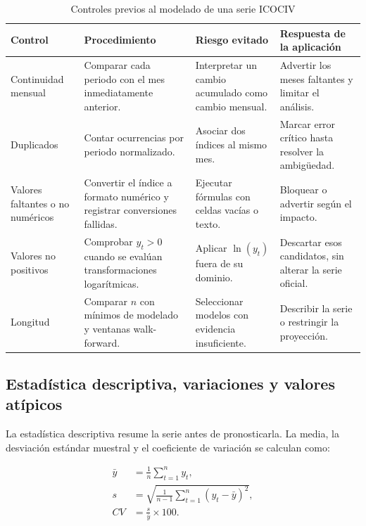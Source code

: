\documentclass[12pt,letterpaper]{article}
\begin{document}
\begin{table}[H]
\centering
\caption{Controles previos al modelado de una serie ICOCIV}
\label{tab:controles_previos_modelado}
\vspace{\baselineskip}
\scriptsize
\begin{adjustbox}{max width=\textwidth}
\begin{tabularx}{\textwidth}{@{}p{3.2cm}YYY@{}}
\toprule
\textbf{Control} & \textbf{Procedimiento} & \textbf{Riesgo evitado} & \textbf{Respuesta de la aplicación} \\
\midrule
Continuidad mensual & Comparar cada periodo con el mes inmediatamente anterior. & Interpretar un cambio acumulado como cambio mensual. & Advertir los meses faltantes y limitar el análisis. \\
Duplicados & Contar ocurrencias por periodo normalizado. & Asociar dos índices al mismo mes. & Marcar error crítico hasta resolver la ambigüedad. \\
Valores faltantes o no numéricos & Convertir el índice a formato numérico y registrar conversiones fallidas. & Ejecutar fórmulas con celdas vacías o texto. & Bloquear o advertir según el impacto. \\
Valores no positivos & Comprobar \(y_t>0\) cuando se evalúan transformaciones logarítmicas. & Aplicar \(\ln(y_t)\) fuera de su dominio. & Descartar esos candidatos, sin alterar la serie oficial. \\
Longitud & Comparar \(n\) con mínimos de modelado y ventanas walk-forward. & Seleccionar modelos con evidencia insuficiente. & Describir la serie o restringir la proyección. \\
\bottomrule
\end{tabularx}
\end{adjustbox}
\end{table}

\subsection{Estadística descriptiva, variaciones y valores atípicos}

La estadística descriptiva resume la serie antes de pronosticarla. La media, la desviación estándar muestral y el coeficiente de variación se calculan como:

\begin{align}
\bar{y} &= \frac{1}{n}\sum_{t=1}^{n}y_t, \\
s &= \sqrt{\frac{1}{n-1}\sum_{t=1}^{n}(y_t-\bar{y})^2}, \\
CV &= \frac{s}{\bar{y}}\times100.
\end{align}
\end{document}
